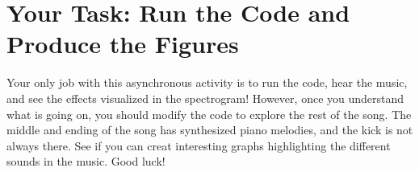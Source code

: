 \documentclass[12pt]{article}
\begin{document}
\section{Your Task: Run the Code and Produce the Figures}

Your only job with this asynchronous activity is to run the code, hear the music, and see the effects visualized in the spectrogram!  However, once you understand what is going on, you should modify the code to explore the rest of the song.  The middle and ending of the song has synthesized piano melodies, and the kick is not always there.  See if you can creat interesting graphs highlighting the different sounds in the music.  Good luck!
\end{document}

